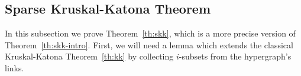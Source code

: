\documentclass[11pt]{article}
\makeatletter
\renewenvironment{proof}[1][\proofname]
{\par\pushQED{\qed}
	\normalfont\topsep6\p@\@plus6\p@\relax\trivlist
	\item[\hskip\labelsep\bfseries#1\@addpunct{.}]
	\ignorespaces}
{\popQED\endtrivlist\@endpefalse}
\newtheorem{lemma}[theo]{Lemma}
\renewcommand{\a}{\alpha}
\makeatother
\begin{document}
%


\subsection{Sparse Kruskal-Katona Theorem}



In this subsection we prove Theorem~\ref{th:skk}, which is a more precise version of Theorem~\ref{th:skk-intro}.
First, we will need a lemma which extends the classical Kruskal-Katona Theorem~\ref{th:kk} by collecting $i$-subsets from the hypergraph's links.

\newcommand{\II}{\mathcal{I}}
\end{document}
